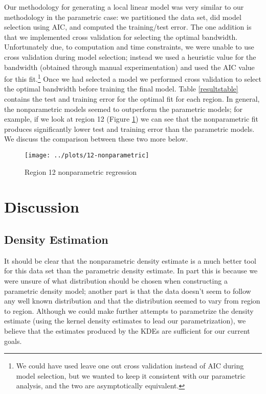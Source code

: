 \documentclass[12pt]{article}
\begin{document}
Our methodology for generating a local linear model was very similar to our methodology in the parametric case: we partitioned the data set, did model selection using AIC, and computed the training/test error. The one addition is that we implemented cross validation for selecting the optimal bandwidth. Unfortunately due, to computation and time constraints, we were unable to use cross validation during model selection; instead we used a heuristic value for the bandwidth (obtained through manual experimentation) and used the AIC value for this fit.\footnote{We could have used leave one out cross validation instead of AIC during model selection, but we wanted to keep it consistent with our parametric analysis, and the two are asymptotically equivalent.} Once we had selected a model we performed cross validation to select the optimal bandwidth before training the final model. Table \ref{resultstable} contains the test and training error for the optimal fit for each region. In general, the nonparametric models seemed to outperform the parametric models; for example, if we look at region 12 (Figure \ref{region12nonparametric}) we can see that the nonparametric fit produces significantly lower test and training error than the parametric models. We discuss the comparison between these two more below.
\begin{figure}[!ht]
\centering
\texttt{[image: ../plots/12-nonparametric]}
\caption{Region 12 nonparametric regression}
\label{region12nonparametric}
\end{figure}
\section{Discussion}
\subsection{Density Estimation}
It should be clear that the nonparametric density estimate is a much better tool for this data set than the parametric density estimate. In part this is because we were unsure of what distribution should be chosen when constructing a parametric density model; another part is that the data doesn't seem to follow any well known distribution and that the distribution seemed to vary from region to region. Although we could make further attempts to parametrize the density estimate (using the kernel density estimates to lead our parametrization), we believe that the estimates produced by the KDEs are sufficient for our current goals.
\end{document}
